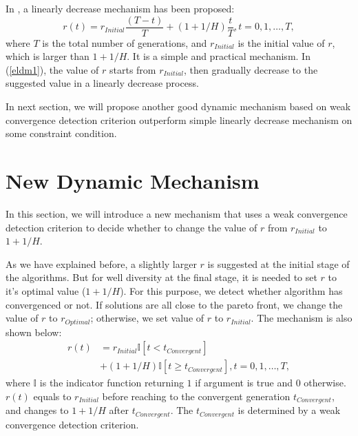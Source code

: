 \documentclass[conference]{IEEEtran}
\begin{document}
In \cite{hisao}, a linearly decrease mechanism has been proposed:
\begin{equation}\label{eldm1}
  r(t)=r_{Initial}\frac{(T-t)}{T}+(1+1/H)\frac{t}{T}, t=0,1,\dots,T,
\end{equation}
where $T$ is the total number of generations, and $r_{Initial}$ is the initial value of $r$,
which is larger than $1+1/H$.
It is a simple and practical mechanism. In (\ref{eldm1}), the value of $r$ starts from $r_{Initial}$,
then gradually decrease to the suggested value in a linearly decrease process. 

In next section, we will propose another good dynamic mechanism based on weak convergence 
detection criterion outperform simple linearly decrease mechanism on some constraint condition.

% 
\section{New Dynamic Mechanism}
In this section,
we will introduce a new mechanism that uses a weak convergence detection criterion to 
decide whether to change the value of $r$ from $r_{Initial}$ to $1+1/H$. 

As we have explained before, 
a slightly larger $r$ is suggested at the initial stage of the algorithms. 
But for well diversity at the final stage,
it is needed to set $r$ to it's optimal value ($1+1/H$). 
For this purpose, we detect whether algorithm has convergenced or not.  
If solutions are all close to the pareto front, 
we change the value of $r$ to $r_{Optimal}$; otherwise, we set value of $r$ to 
$r_{Initial}$. The mechanism is also shown below:
\begin{equation}\begin{aligned}\label{endm1}
  r(t)&=r_{Initial}\mathbb{I}\left[t<t_{Convergent}\right]\\
  &+(1+1/H)\mathbb{I}\left[t \ge t_{Convergent}\right], t=0,1,\dots,T,
\end{aligned}
\end{equation}
where $\mathbb{I}$ is the indicator function returning $1$ if argument is true and $0$ otherwise.
$r(t)$ equals to $r_{Initial}$ before reaching to the convergent generation $t_{Convergent}$,
and changes to $1+1/H$ after $t_{Convergent}$. 
The $t_{Convergent}$ is determined by a weak convergence detection criterion. 
\end{document}
